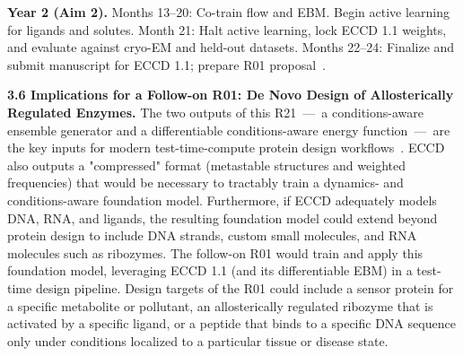 \documentclass[11pt]{article}
\newcommand{\ECCD}{ECCD\xspace}
\begin{document}
\textbf{Year 2 (Aim 2).} Months 13--20: Co-train flow and EBM. Begin active learning for ligands and solutes. Month 21: Halt active learning, lock \ECCD 1.1 weights, and evaluate against cryo-EM and held-out datasets. Months 22--24: Finalize and submit manuscript for ECCD 1.1; prepare R01 proposal~\cite{didi_Scaling_2026}.

\textbf{3.6 Implications for a Follow-on R01: De Novo Design of Allosterically Regulated Enzymes.} The two outputs of this R21~---~a conditions-aware ensemble generator and a differentiable conditions-aware energy function~---~are the key inputs for modern test-time-compute protein design workflows~\cite{didi_Scaling_2026,ahern_Atom_2025,butcher_novo_2025,wang_DPLM2_2024a,shuai_Ensembleconditioned_2025}. ECCD also outputs a "compressed" format (metastable structures and weighted frequencies) that would be necessary to tractably train a dynamics- and conditions-aware foundation model. Furthermore, if ECCD adequately models DNA, RNA, and ligands, the resulting foundation model could extend beyond protein design to include DNA strands, custom small molecules, and RNA molecules such as ribozymes. The follow-on R01 would train and apply this foundation model, leveraging ECCD 1.1 (and its differentiable EBM) in a test-time design pipeline. Design targets of the R01 could include a sensor protein for a specific metabolite or pollutant, an allosterically regulated ribozyme that is activated by a specific ligand, or a peptide that binds to a specific DNA sequence only under conditions localized to a particular tissue or disease state.





\printbibliography
\end{document}
